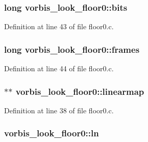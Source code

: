 \subsubsection[{\texorpdfstring{bits}{bits}}]{\setlength{\rightskip}{0pt plus 5cm}long vorbis\+\_\+look\+\_\+floor0\+::bits}\hypertarget{structvorbis__look__floor0_a7467d9fbcab1ebbc0fc56ecd1f4efa6b}{}\label{structvorbis__look__floor0_a7467d9fbcab1ebbc0fc56ecd1f4efa6b}


Definition at line 43 of file floor0.\+c.

\subsubsection[{\texorpdfstring{frames}{frames}}]{\setlength{\rightskip}{0pt plus 5cm}long vorbis\+\_\+look\+\_\+floor0\+::frames}\hypertarget{structvorbis__look__floor0_a14e16b6b502677e8ec256f54838eb932}{}\label{structvorbis__look__floor0_a14e16b6b502677e8ec256f54838eb932}


Definition at line 44 of file floor0.\+c.

\subsubsection[{\texorpdfstring{linearmap}{linearmap}}]{$\ast$$\ast$ vorbis\+\_\+look\+\_\+floor0\+::linearmap}\hypertarget{structvorbis__look__floor0_ad94c008fd959bf0111e3371a78385bbb}{}\label{structvorbis__look__floor0_ad94c008fd959bf0111e3371a78385bbb}


Definition at line 38 of file floor0.\+c.

\subsubsection[{\texorpdfstring{ln}{ln}}]{ vorbis\+\_\+look\+\_\+floor0\+::ln}\hypertarget{structvorbis__look__floor0_aee9a6a8b6dccc47a80928209322cf83d}{}\label{structvorbis__look__floor0_aee9a6a8b6dccc47a80928209322cf83d}


